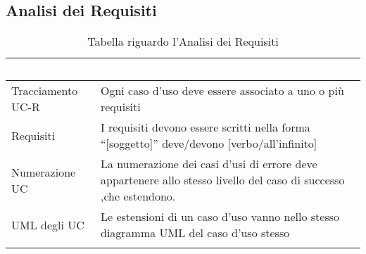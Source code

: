 \subsection{Analisi dei Requisiti}
{
    \setlength{\freewidth}{\dimexpr\textwidth-10\tabcolsep}
    \renewcommand{\arraystretch}{1.5}
    \centering
    \setlength{\aboverulesep}{0pt}
    \setlength{\belowrulesep}{0pt}
    \begin{longtable}{C{.5\freewidth} C{.5\freewidth}}
       \toprule
    \textcolor{white}{\textbf{Aspetto}}&
    \textcolor{white}{\textbf{Spiegazione}}\\
    \toprule
    \endhead

    Tracciamento UC-R & Ogni caso d'uso deve essere associato a uno o più requisiti \\
    Requisiti & I requisiti devono essere scritti nella forma “[soggetto]” deve/devono [verbo/all'infinito]  \\
    Numerazione UC & La numerazione dei casi d'usi di errore deve appartenere allo stesso livello del caso di successo ,che estendono.\\
    UML degli UC & Le estensioni di un caso d'uso vanno nello stesso diagramma UML del caso d'uso stesso \\
    
    \bottomrule
    \caption{Tabella riguardo l'Analisi dei Requisiti}
\end{longtable}
    
}
